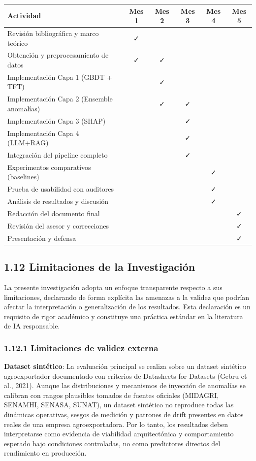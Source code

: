 \begin{longtable}[]{@{}lccccc@{}}
\toprule\noalign{}
Actividad & Mes 1 & Mes 2 & Mes 3 & Mes 4 & Mes 5 \\
\midrule\noalign{}
\endhead
\bottomrule\noalign{}
\endlastfoot
Revisión bibliográfica y marco teórico & ✓ & & & & \\
Obtención y preprocesamiento de datos & ✓ & ✓ & & & \\
Implementación Capa 1 (GBDT + TFT) & & ✓ & & & \\
Implementación Capa 2 (Ensemble anomalías) & & ✓ & ✓ & & \\
Implementación Capa 3 (SHAP) & & & ✓ & & \\
Implementación Capa 4 (LLM+RAG) & & & ✓ & & \\
Integración del pipeline completo & & & ✓ & & \\
Experimentos comparativos (baselines) & & & & ✓ & \\
Prueba de usabilidad con auditores & & & & ✓ & \\
Análisis de resultados y discusión & & & & ✓ & \\
Redacción del documento final & & & & & ✓ \\
Revisión del asesor y correcciones & & & & & ✓ \\
Presentación y defensa & & & & & ✓ \\
\end{longtable}

\subsection{1.12 Limitaciones de la
Investigación}\label{limitaciones-de-la-investigaciuxf3n}

La presente investigación adopta un enfoque transparente respecto a sus
limitaciones, declarando de forma explícita las amenazas a la validez
que podrían afectar la interpretación o generalización de los
resultados. Esta declaración es un requisito de rigor académico y
constituye una práctica estándar en la literatura de IA responsable.

\subsubsection{1.12.1 Limitaciones de validez
externa}\label{limitaciones-de-validez-externa}

\textbf{Dataset sintético}: La evaluación principal se realiza sobre un
dataset sintético agroexportador documentado con criterios de Datasheets
for Datasets (Gebru et al., 2021). Aunque las distribuciones y
mecanismos de inyección de anomalías se calibran con rangos plausibles
tomados de fuentes oficiales (MIDAGRI, SENAMHI, SENASA, SUNAT), un
dataset sintético no reproduce todas las dinámicas operativas, sesgos de
medición y patrones de drift presentes en datos reales de una empresa
agroexportadora. Por lo tanto, los resultados deben interpretarse como
evidencia de viabilidad arquitectónica y comportamiento esperado bajo
condiciones controladas, no como predictores directos del rendimiento en
producción.

